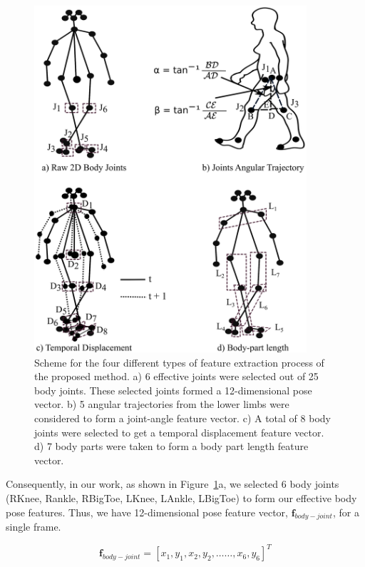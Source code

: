 \begin{figure}
	\centering 
	\includegraphics[width = 0.9\textwidth]{figures/extracted_features.eps}
	\caption[Scheme for the four different types of feature extraction process of the proposed method]
	{Scheme for the four different types of feature extraction process of the proposed method. a) 6 effective joints were selected out of 25 body joints. These selected joints formed a 12-dimensional pose vector. b) 5 angular trajectories from the lower limbs were considered to form a joint-angle feature vector. c) A total of 8 body joints were selected to get a temporal displacement feature vector. d) 7 body parts were taken to form a body part length feature vector.\label{fig:extracted_features}
	}
\end{figure}

Consequently, in our work, as shown in Figure~\ref{fig:extracted_features}a, we selected 6 body joints (RKnee, Rankle, RBigToe, LKnee, LAnkle, LBigToe) to form our effective body pose features. Thus, we have 12-dimensional pose feature vector, $\textbf{f}_{body-joint}$, for a single frame. 

\begin{equation}
  \textbf {f}_{body-joint}= [x_1, y_1, x_2, y_2, \ldots\ldots, x_6, y_6]^T
\end{equation}

